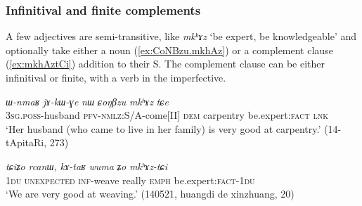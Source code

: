\documentclass[oneside,a4paper,11pt]{article}
\newcommand{\ipa}[1]{\textit{\phon#1}}
\newcommand{\jpg}[2]{\ipa{#1} `#2'}
\begin{document}
\subsubsection{Infinitival and finite complements} \label{sec:adj.infinitive}
A few adjectives are semi-transitive, like \jpg{mkʰɤz}{be expert, be knowledgeable} and optionally take either a noun (\ref{ex:CoNBzu.mkhAz}) or a complement clause (\ref{ex:mkhAztCi}) addition to their S. The complement clause can be either infinitival or finite, with a verb in the imperfective.

\begin{exe}
\ex \label{ex:CoNBzu.mkhAz}
\gll 
\ipa{ɯ-nmaʁ} 	\ipa{jɤ-kɯ-ɣe} 	\ipa{nɯ} 	\ipa{ɕoŋβzu} 	\ipa{mkʰɤz} 	\ipa{tɕe} \\
\textsc{3sg.poss}-husband \textsc{pfv-nmlz}:S/A-come[II] \textsc{dem} carpentry be.expert:\textsc{fact} \textsc{lnk} \\
\glt `Her husband (who came to live in her family) is very good at carpentry.' (14-tApitaRi, 273)
\end{exe}

\begin{exe}
\ex \label{ex:mkhAztCi}
\gll \ipa{tɕiʑo} 	\ipa{rcanɯ,} 	\ipa{kɤ-taʁ} 	\ipa{wuma} 	\ipa{ʑo} 	\ipa{mkʰɤz-tɕi} 	 \\
\textsc{1du}  \textsc{unexpected} \textsc{inf}-weave really \textsc{emph} be.expert:\textsc{fact}-\textsc{1du} \\
\glt `We are very good at weaving.' (140521, huangdi de xinzhuang, 20)
\end{exe}
\end{document}

